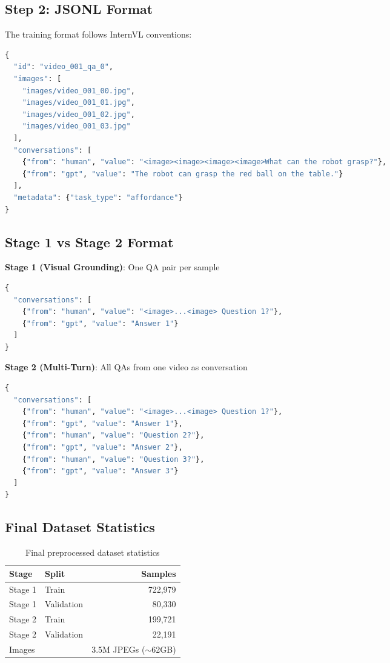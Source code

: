 \documentclass[11pt,a4paper]{article}
\begin{document}
\subsection{Step 2: JSONL Format}

The training format follows InternVL conventions:

\begin{lstlisting}[language=Python,caption=JSONL training format]
{
  "id": "video_001_qa_0",
  "images": [
    "images/video_001_00.jpg",
    "images/video_001_01.jpg",
    "images/video_001_02.jpg",
    "images/video_001_03.jpg"
  ],
  "conversations": [
    {"from": "human", "value": "<image><image><image><image>What can the robot grasp?"},
    {"from": "gpt", "value": "The robot can grasp the red ball on the table."}
  ],
  "metadata": {"task_type": "affordance"}
}
\end{lstlisting}

\subsection{Stage 1 vs Stage 2 Format}

\textbf{Stage 1 (Visual Grounding)}: One QA pair per sample
\begin{lstlisting}[language=Python,caption=Stage 1 format: Single QA]
{
  "conversations": [
    {"from": "human", "value": "<image>...<image> Question 1?"},
    {"from": "gpt", "value": "Answer 1"}
  ]
}
\end{lstlisting}

\textbf{Stage 2 (Multi-Turn)}: All QAs from one video as conversation
\begin{lstlisting}[language=Python,caption=Stage 2 format: Multi-turn conversation]
{
  "conversations": [
    {"from": "human", "value": "<image>...<image> Question 1?"},
    {"from": "gpt", "value": "Answer 1"},
    {"from": "human", "value": "Question 2?"},
    {"from": "gpt", "value": "Answer 2"},
    {"from": "human", "value": "Question 3?"},
    {"from": "gpt", "value": "Answer 3"}
  ]
}
\end{lstlisting}

\subsection{Final Dataset Statistics}

\begin{table}[H]
\centering
\begin{tabular}{@{}llr@{}}
\toprule
\textbf{Stage} & \textbf{Split} & \textbf{Samples} \\
\midrule
Stage 1 & Train & 722,979 \\
Stage 1 & Validation & 80,330 \\
Stage 2 & Train & 199,721 \\
Stage 2 & Validation & 22,191 \\
\midrule
Images & & 3.5M JPEGs ($\sim$62GB) \\
\bottomrule
\end{tabular}
\caption{Final preprocessed dataset statistics}
\end{table}
\end{document}
